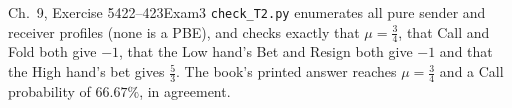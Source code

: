 \begin{exsol}{\MG{} Ch.~9, Exercise 5}{422--423}{Exam}{3}
\verify \texttt{check\_T2.py} enumerates all pure sender and receiver profiles (none is a PBE),
and checks exactly that $\mu = \frac34$, that Call and Fold both give $-1$, that the Low hand's
Bet and Resign both give $-1$ and that the High hand's bet gives $\frac53$. The book's printed
answer reaches $\mu = \frac34$ and a Call probability of $66.67\%$, in agreement.

\end{exsol}
